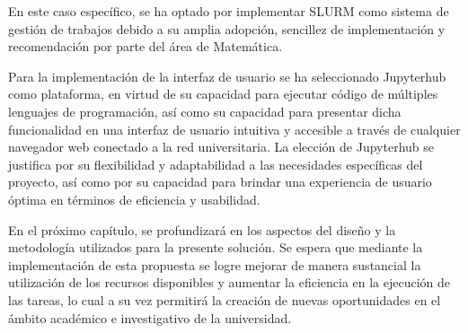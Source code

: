 \begin{spacing}{1.5}
    En este caso específico, se ha optado por implementar SLURM como sistema de gestión de trabajos debido a su amplia adopción, sencillez de implementación y recomendación por parte del área de Matemática.

    Para la implementación de la interfaz de usuario se ha seleccionado Jupyterhub como plataforma, en virtud de su capacidad para ejecutar código de múltiples lenguajes de programación, así como su capacidad para presentar dicha funcionalidad en una interfaz de usuario intuitiva y accesible a través de cualquier navegador web conectado a la red universitaria. La elección de Jupyterhub se justifica por su flexibilidad y adaptabilidad a las necesidades específicas del proyecto, así como por su capacidad para brindar una experiencia de usuario óptima en términos de eficiencia y usabilidad.

    En el próximo capítulo, se profundizará en los aspectos del diseño y la metodología utilizados para la presente solución. Se espera que mediante la implementación de esta propuesta se logre mejorar de manera sustancial la utilización de los recursos disponibles y aumentar la eficiencia en la ejecución de las tareas, lo cual a su vez permitirá la creación de nuevas oportunidades en el ámbito académico e investigativo de la universidad.

  \mylinespacing
  \mylinespacing
  \begin{tightcenter}
  \end{tightcenter}
\end{spacing}
